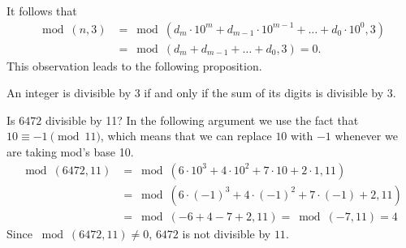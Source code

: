 It follows that 
\begin{align*}
\bmod(n,3)&=\bmod(d_m\cdot 10^m+d_{m-1}\cdot 10^{m-1}+\dots +d_{0}\cdot 10^0,3) \\
&=\bmod(d_{m}+d_{m-1}+\dots+d_{0},3)=0.
\end{align*} 
This observation leads to the following proposition.

\begin{prop}\label{proposition:bases:divisibility by 3}
An integer is divisible by 3 if and only if the sum of its digits is divisible by 3.
\end{prop}

\begin{example}\label{example:bases:6472 divisble by 11}
Is $6472$ divisible by 11? In the following argument we use the fact that $10 \equiv-1\pmod{11}$, which means that we can replace $10$ with $-1$ whenever we are taking mod's base 10.
\begin{align*}
\bmod(6472,11)&=\bmod(6\cdot 10^{3}+4\cdot 10^{2}+7\cdot 10+2\cdot 1,11) \\
&=\bmod(6\cdot (-1)^{3}+4\cdot (-1)^{2} + 7\cdot (-1) + 2,11)\\
&=\bmod(-6+4-7+2,11)=\bmod(-7,11)=4
\end{align*}
Since $\bmod(6472,11)\neq 0$, $6472$ is not divisible by $11$.
\end{example}

